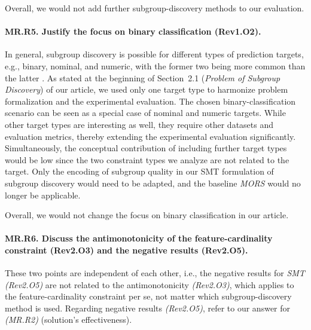 \documentclass{article}
\begin{document}
Overall, we would not add further subgroup-discovery methods to our evaluation.

\paragraph{MR.R5. Justify the focus on binary classification (Rev1.O2).}

In general, subgroup discovery is possible for different types of prediction targets, e.g., binary, nominal, and numeric, with the former two being more common than the latter \cite{atzmueller2015subgroup}.
As stated at the beginning of Section~2.1 (\emph{Problem of Subgroup Discovery}) of our article, we used only one target type to harmonize problem formalization and the experimental evaluation.
The chosen binary-classification scenario can be seen as a special case of nominal and numeric targets.
While other target types are interesting as well, they require other datasets and evaluation metrics, thereby extending the experimental evaluation significantly.
Simultaneously, the conceptual contribution of including further target types would be low since the two constraint types we analyze are not related to the target.
Only the encoding of subgroup quality in our SMT formulation of subgroup discovery would need to be adapted, and the baseline \emph{MORS} would no longer be applicable.

Overall, we would not change the focus on binary classification in our article.

\paragraph{MR.R6. Discuss the antimonotonicity of the feature-cardinality constraint (Rev2.O3) and the negative results (Rev2.O5).}

These two points are independent of each other, i.e., the negative results for \emph{SMT} \emph{(Rev2.O5)} are not related to the antimonotonicity \emph{(Rev2.O3)}, which applies to the feature-cardinality constraint per se, not matter which subgroup-discovery method is used.
Regarding negative results \emph{(Rev2.O5)}, refer to our answer for \emph{(MR.R2)} (solution's effectiveness).
\end{document}
